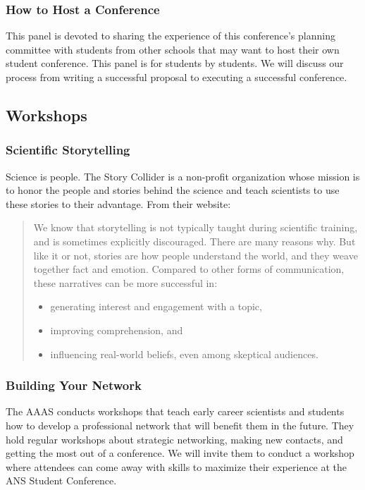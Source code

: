 \subsubsection{How to Host a Conference}
This panel is devoted to sharing the experience of this conference's planning committee with students from other schools that may want to host their own student conference. This panel is for students by students. We will discuss our process from writing a successful proposal to executing a successful conference. 


\subsection{Workshops}

\subsubsection{Scientific Storytelling}
Science is people. The Story Collider is a non-profit organization whose mission is to honor the people and stories behind the science and teach scientists to use these stories to their advantage. From their website:
\begin{quote}
	We know that storytelling is not typically taught during scientific training, and is sometimes explicitly discouraged. There are many reasons why. But like it or not, stories are how people understand the world, and they weave together fact and emotion. Compared to other forms of communication, these narratives can be more successful in:
	\begin{itemize}
		\item generating interest and engagement with a topic,
		\item improving comprehension, and
		\item influencing real-world beliefs, even among skeptical audiences.
	\end{itemize}
\end{quote}

\subsubsection{Building Your Network}
The AAAS conducts workshops that teach early career scientists and students how to develop a professional network that will benefit them in the future. They hold regular workshops about strategic networking, making new contacts, and getting the most out of a conference. We will invite them to conduct a workshop where attendees can come away with skills to maximize their experience at the ANS Student Conference.

